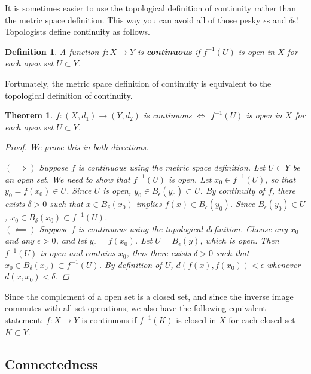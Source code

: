 \documentclass[12pt]{amsart}         %
\newtheorem{definition}{Definition}[section]
\newtheorem{theorem}{Theorem}[section]
\theoremstyle{remark}
\begin{document}
It is sometimes easier to use the topological definition of continuity rather than the metric space definition. This way you can avoid all of those pesky $\epsilon$s and $\delta$s! Topologists define continuity as follows.

\begin{definition}
A function $f: X \rightarrow Y$ is \textbf{continuous} if $f^{-1}(U)$ is open in $X$ for each open set $U \subset Y$.
\end{definition}

Fortunately, the metric space definition of continuity is equivalent to the topological definition of continuity. 

\begin{theorem}
$f: (X, d_1) \rightarrow (Y, d_2)$ is continuous $\iff$ $f^{-1}(U)$ is open in $X$ for each open set $U \subset Y$.
\begin{proof}We prove this in both directions.

\indent $(\implies)$ Suppose $f$ is continuous using the metric space definition. Let $U \subset Y$ be an open set. We need to show that $f^{-1}(U)$ is open. Let $x_0 \in f^{-1}(U)$, so that $y_0 = f(x_0) \in U$. Since $U$ is open, $y_0 \in B_\epsilon(y_0) \subset U$. By continuity of $f$, there exists $\delta > 0$ such that $x \in B_\delta(x_0)$ implies $f(x) \in B_\epsilon(y_0)$. Since $B_\epsilon(y_0) \in U$, $x_0 \in B_\delta(x_0) \subset f^{-1}(U)$.\\

\indent $(\impliedby)$ Suppose $f$ is continuous using the topological definition. Choose any $x_0$ and any $\epsilon > 0$, and let $y_0 = f(x_0)$. Let $U = B_\epsilon(y)$, which is open. Then $f^{-1}(U)$ is open and contains $x_0$, thus there exists $\delta > 0$ such that $x_0 \in B_\delta(x_0) \subset f^{-1}(U)$. By definition of $U$, $d(f(x), f(x_0)) < \epsilon$ whenever $d(x, x_0) < \delta$.
\end{proof}
\end{theorem}

Since the complement of a open set is a closed set, and since the inverse image commutes with all set operations, we also have the following equivalent statement: $f: X \rightarrow Y$ is continuous if $f^{-1}(K)$ is closed in $X$ for each closed set $K \subset Y$.

\subsection{Connectedness}
\end{document}
